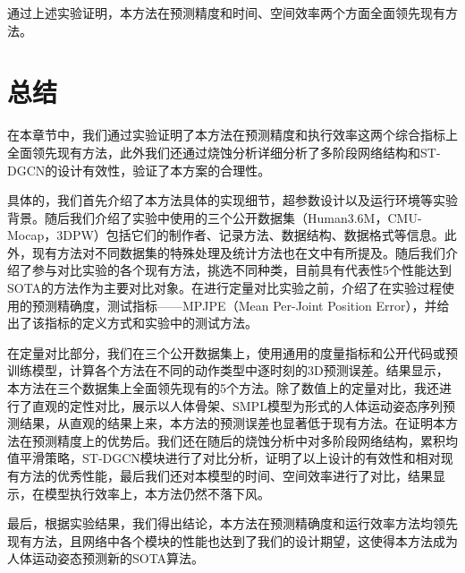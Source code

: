 通过上述实验证明，本方法在预测精度和时间、空间效率两个方面全面领先现有方法。

\section{总结}
在本章节中，我们通过实验证明了本方法在预测精度和执行效率这两个综合指标上全面领先现有方法，此外我们还通过烧蚀分析详细分析了多阶段网络结构和ST-DGCN的设计有效性，验证了本方案的合理性。

具体的，我们首先介绍了本方法具体的实现细节，超参数设计以及运行环境等实验背景。随后我们介绍了实验中使用的三个公开数据集（Human3.6M，CMU-Mocap，3DPW）包括它们的制作者、记录方法、数据结构、数据格式等信息。此外，现有方法对不同数据集的特殊处理及统计方法也在文中有所提及。随后我们介绍了参与对比实验的各个现有方法，挑选不同种类，目前具有代表性5个性能达到SOTA的方法作为主要对比对象。在进行定量对比实验之前，介绍了在实验过程使用的预测精确度，测试指标——MPJPE（Mean Per-Joint Position Error），并给出了该指标的定义方式和实验中的测试方法。

在定量对比部分，我们在三个公开数据集上，使用通用的度量指标和公开代码或预训练模型，计算各个方法在不同的动作类型中逐时刻的3D预测误差。结果显示，本方法在三个数据集上全面领先现有的5个方法。除了数值上的定量对比，我还进行了直观的定性对比，展示以人体骨架、SMPL模型为形式的人体运动姿态序列预测结果，从直观的结果上来，本方法的预测误差也显著低于现有方法。在证明本方法在预测精度上的优势后。我们还在随后的烧蚀分析中对多阶段网络结构，累积均值平滑策略，ST-DGCN模块进行了对比分析，证明了以上设计的有效性和相对现有方法的优秀性能，最后我们还对本模型的时间、空间效率进行了对比，结果显示，在模型执行效率上，本方法仍然不落下风。

最后，根据实验结果，我们得出结论，本方法在预测精确度和运行效率方法均领先现有方法，且网络中各个模块的性能也达到了我们的设计期望，这使得本方法成为人体运动姿态预测新的SOTA算法。

